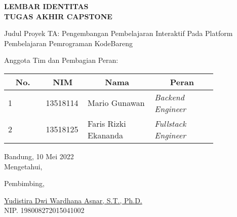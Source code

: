 \clearpage
\pagestyle{empty}

\begin{center}
  \smallskip

  \Large \bfseries \MakeUppercase{Lembar Identitas \\ Tugas Akhir Capstone}
  \vspace{\baselineskip}

  \normalsize \normalfont
  \begin{flushleft}
    Judul Proyek TA\qquad: Pengembangan Pembelajaran Interaktif Pada Platform Pembelajaran Pemrograman KodeBareng
    \medskip

    Anggota Tim dan Pembagian Peran:
    \bigskip
  \end{flushleft}

  \begin{center}
    \begin{tabular}{ |l|p{0.2\linewidth}|p{0.325\linewidth}|p{0.3\linewidth}| }
      \hline
      \multicolumn{1}{|c|}{\textbf{No.}} & \multicolumn{1}{c|}{\textbf{NIM}} & \multicolumn{1}{c|}{\textbf{Nama}} & \multicolumn{1}{c|}{\textbf{Peran}} \\
      \hline
      1                                  & 13518114                          & Mario Gunawan                      & \textit{Backend Engineer}           \\
      \hline
      2                                  & 13518125                          & Faris Rizki Ekananda               & \textit{Fullstack Engineer}         \\
      \hline
    \end{tabular}
  \end{center}

  \vfill
  Bandung, 10 Mei 2022 \\
  Mengetahui,

  \vspace{0.5cm}
  Pembimbing,

  \vspace{2cm}
  \underline{Yudistira Dwi Wardhana Asnar, S.T., Ph.D.} \\
  NIP. 198008272015041002
  \vspace{3cm}

\end{center}
\clearpage
